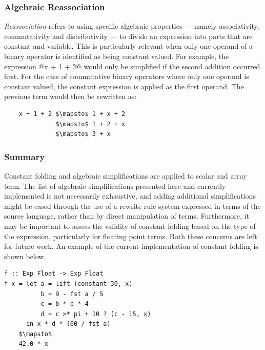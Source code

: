 \subsubsection{Algebraic Reassociation}

\emph{Reassociation} refers to using specific algebraic properties --- namely
associativity, commutativity and distributivity --- to divide an expression into
parts that are constant and variable.
This is particularly relevant when only one operand of a binary
operator is identified as being constant valued. For example, the expression
@x + 1 + 2@ would only be simplified if the second addition occurred
first. For the case of commutative binary operators where only one operand is
constant valued, the constant expression is applied as the first operand. The
previous term would then be rewritten as:
%
\begin{lstlisting}[style=Haskell,numbers=none,mathescape]
%\bf$\langle$ algebraic reassociation $\rangle$%
    x + 1 + 2 $\mapsto$ 1 + x + 2
              $\mapsto$ 1 + 2 + x
              $\mapsto$ 3 + x
\end{lstlisting}


\subsubsection{Summary}

Constant folding and algebraic simplifications are applied to scalar and array
term. The list of algebraic simplifications presented here and currently
implemented is not necessarily exhaustive, and adding additional simplifications
might be eased through the use of a rewrite rule system expressed in terms of
the source language, rather than by direct manipulation of 
terms. Furthermore, it may be important to assess the validity of constant
folding based on the type of the expression, particularly for floating point
terms. Both these concerns are left for future work. An example of the current
implementation of constant folding is shown below.

\begin{lstlisting}[style=Haskell,mathescape,caption={Example of constant expression evaluation}]
f :: Exp Float -> Exp Float
f x = let a = lift (constant 30, x)
          b = 9 - fst a / 5
          c = b * b * 4
          d = c >* pi + 10 ? (c - 15, x)
      in x * d * (60 / fst a)
    $\mapsto$
    42.0 * x
\end{lstlisting}


